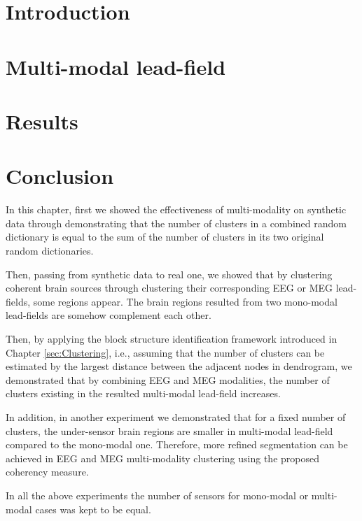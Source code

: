 
\section{Introduction}

\section{Multi-modal lead-field}

\section{Results}

\section{Conclusion}
In this chapter, first we showed the effectiveness of multi-modality on synthetic data through demonstrating that the number of clusters in a combined random dictionary is equal to the sum of the number of clusters in its two original random dictionaries.

Then, passing from synthetic data to real one, we showed that by clustering coherent brain sources through clustering their corresponding EEG or MEG lead-fields, some regions appear.
The brain regions resulted from two mono-modal lead-fields are somehow complement each other.

Then, by applying the block structure identification framework introduced in Chapter \ref{sec:Clustering}, i.e., assuming that the number of clusters can be estimated by the largest distance between the adjacent nodes in dendrogram, we demonstrated that by combining EEG and MEG modalities, the number of clusters existing in the resulted multi-modal lead-field increases.

In addition, in another experiment we demonstrated that for a fixed number of clusters, the under-sensor brain regions are smaller in multi-modal lead-field compared to the mono-modal one.
Therefore, more refined segmentation can be achieved in EEG and MEG multi-modality clustering using the proposed coherency measure.

In all the above experiments the number of sensors for mono-modal or multi-modal cases was kept to be equal.

